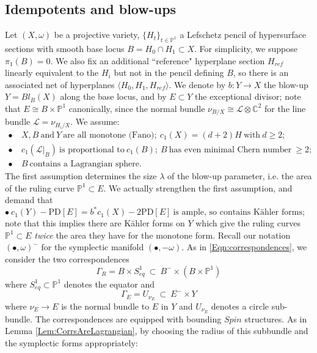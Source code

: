 \documentclass[reqno,10pt]{amsart}
\numberwithin{equation}{section}
\newcommand{\bC}{{\mathbb C}}
\newcommand{\bP}{{\mathbb P}}
\theoremstyle{remark}
\begin{document}
\subsection{Idempotents and blow-ups\label{Section:Idempotent}}

Let $(X,\omega)$ be a projective variety, $\{H_t\}_{t\in\bP^1}$ a Lefschetz pencil of hypersurface sections with smooth base locus $B = H_0\cap H_1 \subset X$.  For simplicity, we suppose $\pi_1(B) = 0$.  We also fix an additional ``reference" hyperplane section $H_{ref}$ linearly equivalent to the $H_i$ but not in the pencil defining $B$, so there is an associated net of hyperplanes $\langle H_0, H_1, H_{ref}\rangle$. We denote by $b: Y\rightarrow X$ the blow-up $Y=Bl_B(X)$ along the base locus, and by $E\subset Y$ the exceptional divisor; note that $E \cong B\times \bP^1$ canonically, since the normal bundle $\nu_{B/X} \cong \mathcal{L} \otimes \bC^2$ for the line bundle $\mathcal{L} = \nu_{H_i/X}$. We assume:
\begin{equation}
\begin{aligned} \label{Equation:Hypothesis}
\bullet \ &  X, B \ \textrm{and}  \ Y \ \textrm{are all monotone (Fano)};  \ c_1(X) = (d+2)H \ \textrm{with} \ d\geq 2; \\
\bullet \ & c_1(\mathcal{L}|_B) \ \textrm{is proportional to} \  c_1(B);  \ B \ \textrm{has even minimal Chern number} \  \geq 2; \\
\bullet \ & B  \ \textrm{contains a Lagrangian sphere}. 
\end{aligned} \end{equation} 
The first assumption determines the size $\lambda$ of the blow-up parameter, i.e. the area of the ruling curve $\bP^1 \subset E$.  We actually strengthen the first assumption, and demand that
\begin{equation} \label{Equation:Hypothesis2}
\bullet \  c_1(Y) - \textrm{PD}[E] = b^*c_1(X) - 2\textrm{PD}[E] \ \textrm{is ample, so contains K\"ahler forms}; \quad 
\end{equation}
note that this implies there are K\"ahler forms on $Y$ which give the ruling curves $\bP^1 \subset E$ \emph{twice} the area they have for the monotone form. Recall our  notation  $(\bullet,\omega)^-$ for  the symplectic manifold $(\bullet,-\omega)$.   As in \eqref{Eqn:correspondences}, we consider the two correspondences
\[
\Gamma_R = B\times S^1_{eq} \ \subset \ B^- \times (B \times \bP^1)
\]
where $S^1_{eq} \subset \bP^1$ denotes the equator and 
\[
\Gamma_E = U_{\nu_E} \ \subset \ E^-\times Y
\]
where $\nu_E \rightarrow E$ is the normal bundle to $E$ in $Y$ and $U_{\nu_E}$ denotes a circle sub-bundle.  The correspondences are equipped with bounding $Spin$ structures.  As in Lemma \ref{Lem:CorrsAreLagrangian}, by choosing the radius of this subbundle and the symplectic forms appropriately:
\end{document}
